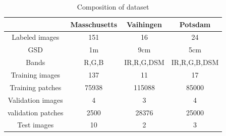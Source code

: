 \begin{table}
 \centering
 \caption{Composition of dataset}
 \begin{tabular}{c|ccc}
\hline
&Masschusetts&Vaihingen &Potsdam\\  \hline
Labeled images & 151& 16 &24\\ \hline
GSD & 1m & 9cm & 5cm\\ \hline
Bands&R,G,B &IR,R,G,DSM &IR,R,G,B,DSM\\ \hline
Training images &137 & 11 & 17\\ \hline
Training patches&75938 &115088 &85000\\ \hline
Validation images & 4 & 3 & 4\\ \hline
validation patches &2500 & 28376 &25000 \\\hline
Test images & 10 & 2 & 3\\ \hline
\end{tabular}
\end {table}
